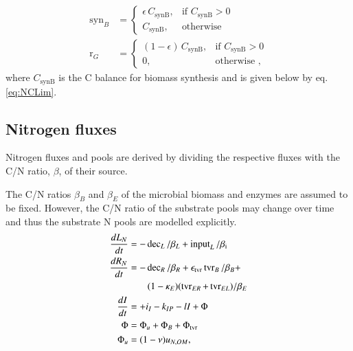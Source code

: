 \begin{subequations}
\label{eq:synB}
\begin{align}
\operatorname{syn}_B &= \begin{cases}
  \epsilon \, C_{\operatorname{synB}},  & \text{if~} C_{\operatorname{synB}} >
  0\\
  C_{\operatorname{synB}}, & \text{otherwise}
\end{cases} \\  
\operatorname{r}_G &= \begin{cases}
  (1 - \epsilon) \, C_{\operatorname{synB}},  & \text{if~}
  C_{\operatorname{synB}} > 0\\
  0, & \text{otherwise ,}
\end{cases}  
\end{align}
\end{subequations}
where $C_{\operatorname{synB}}$ is the C balance for biomass
synthesis and is given below by eq.
\ref{eq:NCLim}.



\subsection{Nitrogen fluxes}
Nitrogen fluxes and pools are derived by dividing the respective fluxes with the
C/N ratio, $\beta$, of their source.

The C/N ratios $\beta_B$ and $\beta_E$ of the microbial biomass and 
enzymes are assumed to be fixed. However, the C/N ratio of the substrate pools
may change over time and thus the substrate N pools are modelled explicitly.
\begin{subequations}
\label{eq:SEAMN}
\begin{align}
\frac{dL_N}{dt} &=  - \operatorname{dec}_L /\beta_{L} +
\operatorname{input}_L/\beta_{\operatorname{i}} 
\\
\frac{dR_N}{dt} &=  - \operatorname{dec}_R /\beta_{R} +
\epsilon_{\operatorname{tvr}} \operatorname{tvr}_B /\beta_{B} + \notag 
\\
& \qquad (1 -\kappa_E) (\operatorname{tvr}_{ER} +
\operatorname{tvr}_{EL})/\beta_{E} 
\\
\frac{dI}{dt} &= +i_I -k_{IP} -l I +\Phi
\\
\Phi &= \Phi_u +\Phi_B + \Phi_{\operatorname{tvr}}
\\
\Phi_u &= (1 -\nu) u_{N,OM}
\text{,} 
\end{align}
\end{subequations}

